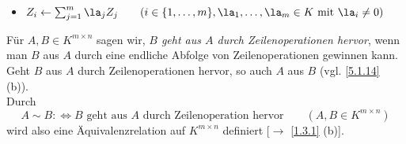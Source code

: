 \documentclass[../../main.tex]{subfiles}
\begin{document}
\begin{notsprbem}
\begin{itemize}
\item$Z_i\leftarrow\sum_{j=1}^m\la_jZ_j\qquad(i\in\{1,\ldots,m\},\la_1,\ldots,\la_m\in K\text{ mit }\la_i\ne0)$\\
\end{itemize}

\end{notsprbem}

\begin{defprop}\label{5.2.2}
Für $A,B\in K^{m\times n}$ sagen wir, \emph{$B$ geht aus $A$ durch Zeilenoperationen hervor}, wenn man $B$ aus $A$ durch eine endliche Abfolge von Zeilenoperationen gewinnen kann.
Geht $B$ aus $A$ durch Zeilenoperationen hervor, so auch $A$ aus $B$ (vgl. \ref{5.1.14} (b)).\\
Durch \[A\sim B:\iff \text{$B$ geht aus $A$ durch Zeilenoperation hervor}\qquad(A,B\in K^{m\times n})\]
 wird also eine Äquivalenzrelation auf $K^{m\times n}$ definiert [$\to$ \ref{1.3.1} (b)].
\end{defprop}
\end{document}
